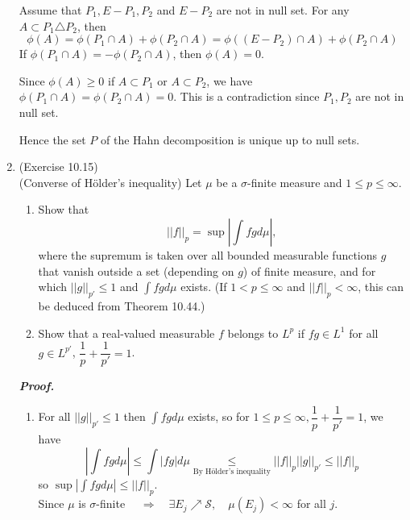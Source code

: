 \documentclass[a4paper,11pt]{article}
\begin{document}
\begin{enumerate}
		Assume that $P_1, E - P_1, P_2$ and $E - P_2$ are not in null set. For any $A \subset P_1 \triangle P_2$, then
			$$\phi(A) = \phi(P_1 \cap A) + \phi(P_2 \cap A) = \phi((E - P_2) \cap A) + \phi(P_2 \cap A)$$
		If $\phi(P_1 \cap A) = - \phi(P_2 \cap A)$, then $\phi(A) = 0$.\

		Since $\phi(A) \geq 0$ if $A \subset P_1$ or $A \subset P_2$, we have $\phi(P_1 \cap A) = \phi(P_2 \cap A) = 0$. This is a contradiction since $P_1, P_2$ are not in null set.\

		Hence the set $P$ of the Hahn decomposition is unique up to null sets.\\
		



	\item (Exercise 10.15)\\
		(Converse of H\"{o}lder’s inequality) Let $\mu$ be a $\sigma$-finite measure and $1 \leq p \leq \infty$.
		\begin{enumerate}
			\item
				Show that
					$$||f||_p = \sup |\int fg d\mu|,$$
				where  the supremum is taken over all bounded measurable functions $g$ that vanish outside a set (depending on $g$) of finite measure, and for which $||g||_{p'} \leq 1$ and $\int fg d\mu$ exists. (If $1 < p \leq \infty$ and $||f||_p < \infty$, this can be deduced from Theorem 10.44.)\\

			\item
				Show that a real-valued measurable $f$ belongs to $L^p$ if $fg \in L^1$ for all $g \in L^{p'}$, $\dfrac{1}{p} + \dfrac{1}{p'} = 1$.\\
		\end{enumerate}
	\textit{\textbf {Proof.}}\\
		\begin{enumerate}
			\item For all $||g||_{p'} \leq 1$ then $\int fg d\mu$ exists, so for $1 \leq p \leq \infty, \dfrac{1}{p} + \dfrac{1}{p'} = 1$, we have
				$$|\int fg d\mu|
				\leq \int |fg| d\mu
				\underset{\text{By H\"{o}lder's inequality}}{\leq} ||f||_{p} ||g||_{p'}
				\leq ||f||_p$$
			so $\sup |\int fg d\mu| \leq ||f||_p$.\\

			Since $\mu$ is $\sigma$-finite $\quad \Rightarrow \quad \exists E_j \nearrow \mathscr{S}, \quad \mu(E_j) < \infty$ for all $j$.\


\end{enumerate}
\end{enumerate}
\end{document}
